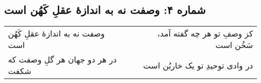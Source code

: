 \begin{center}
\section*{شماره ۴: وصفت نه به اندازۀ عقلِ کَهُن است}
\label{sec:004}
\begin{longtable}{l p{0.5cm} r}
وصفت نه به اندازهٔ عقلِ کَهُن است
&&
کز وصفِ تو هر چه گفته آمد، سَخُن است
\\
در هر دو جهان هر گلِ وصفت که شکفت
&&
در وادی توحیدِ تو یک خاربُن است
\\
\end{longtable}
\end{center}
